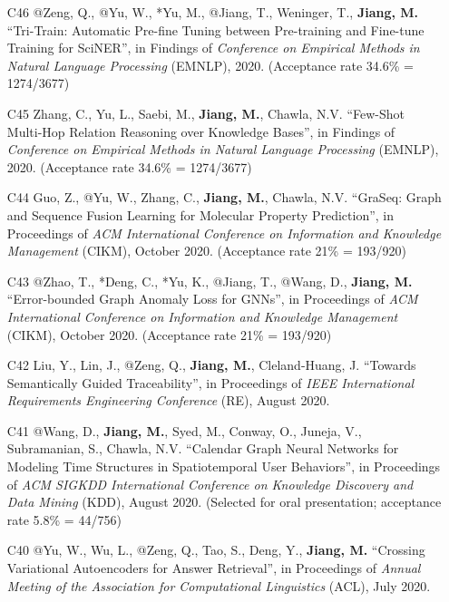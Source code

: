 \documentclass[10pt]{article}
\newenvironment{myindentpar}[1]%
{\begin{list}{}%
         {\setlength{\leftmargin}{#1}}%
         \item[]%
}
{\end{list}}
\newcounter{list}
\begin{document}
\begin{myindentpar}{0.00cm}
\begin{enumerate}[leftmargin=.5cm]
\item[C46] @Zeng, Q., @Yu, W., *Yu, M., @Jiang, T., Weninger, T., \textbf{Jiang, M.} ``Tri-Train: Automatic Pre-fine Tuning between Pre-training and Fine-tune Training for SciNER'', in Findings of \textit{Conference on Empirical Methods in Natural Language Processing} (EMNLP), 2020. (Acceptance rate 34.6\% = 1274/3677)

\item[C45] Zhang, C., Yu, L., Saebi, M., \textbf{Jiang, M.}, Chawla, N.V. ``Few-Shot Multi-Hop Relation Reasoning over Knowledge Bases'', in Findings of \textit{Conference on Empirical Methods in Natural Language Processing} (EMNLP), 2020. (Acceptance rate 34.6\% = 1274/3677)

\item[C44] Guo, Z., @Yu, W., Zhang, C., \textbf{Jiang, M.}, Chawla, N.V. ``GraSeq: Graph and Sequence Fusion Learning for Molecular Property Prediction'', in Proceedings of \textit{ACM International Conference on Information and Knowledge Management} (CIKM), October 2020. (Acceptance rate 21\% = 193/920)
		
\item[C43] @Zhao, T., *Deng, C., *Yu, K., @Jiang, T., @Wang, D., \textbf{Jiang, M.} ``Error-bounded Graph Anomaly Loss for GNNs'', in Proceedings of \textit{ACM International Conference on Information and Knowledge Management} (CIKM), October 2020. (Acceptance rate 21\% = 193/920)

\item[C42] Liu, Y., Lin, J., @Zeng, Q., \textbf{Jiang, M.}, Cleland-Huang, J. ``Towards Semantically Guided Traceability'', in Proceedings of \textit{IEEE International Requirements Engineering Conference} (RE), August 2020.	

\item[C41] @Wang, D., \textbf{Jiang, M.}, Syed, M., Conway, O., Juneja, V., Subramanian, S., Chawla, N.V. ``Calendar Graph Neural Networks for Modeling Time Structures in Spatiotemporal User Behaviors'', in Proceedings of \textit{ACM SIGKDD International Conference on Knowledge Discovery and Data Mining} (KDD), August 2020. (Selected for oral presentation; acceptance rate 5.8\% = 44/756)

\item[C40] @Yu, W., Wu, L., @Zeng, Q., Tao, S., Deng, Y., \textbf{Jiang, M.} ``Crossing Variational Autoencoders for Answer Retrieval'', in Proceedings of \textit{Annual Meeting of the Association for Computational Linguistics} (ACL), July 2020.


\end{enumerate}
\end{myindentpar}
\end{document}
